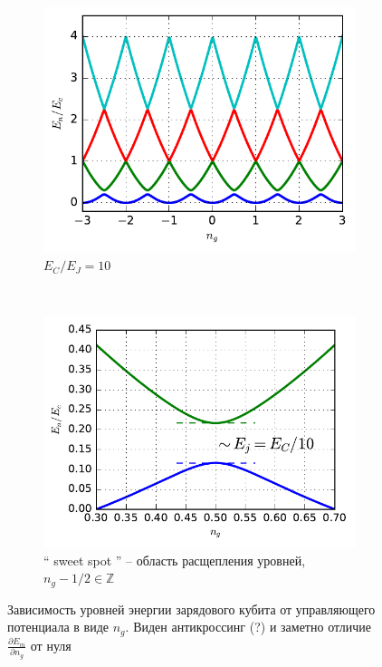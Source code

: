 \documentclass[12pt, twoside]{report}
\numberwithin{equation}{section}
\numberwithin{figure}{section}
\begin{document}
\begin{figure}[!h]
\begingroup
\captionsetup[subfigure]{width=0.9\textwidth, justification=normal}
\centering
\begin{subfigure}[t]{0.49\linewidth}
\centering
\includegraphics[height = .7\textwidth]{Pictures2/charge_qubit_01}
\caption{$E_C / E_J = 10$}
\label{fig:charge-eigens-ng-1}
\end{subfigure}~
\begin{subfigure}[t]{0.49\linewidth}
\centering
\includegraphics[height = .7\textwidth]{Pictures2/charge_qubit_05}
\caption{`` sweet spot '' -- область расщепления уровней, $n_g -1/2 \in \mathbb{Z}$}
\label{fig:charge-eigens-ng-2}
\end{subfigure}
\endgroup
\caption{Зависимость уровней энергии зарядового кубита от управляющего потенциала в виде $n_g$. Виден антикроссинг (?) и заметно отличие $\frac{\partial E_m}{\partial n_g}$ от нуля}
\label{fig:charge-eigens-ng}

\end{figure} 
\end{document}
